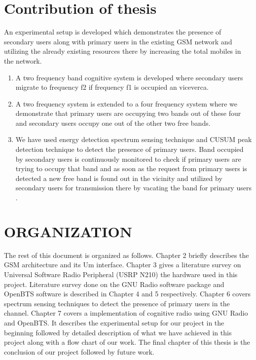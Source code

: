 \section{Contribution of thesis}
An experimental setup is developed which demonstrates the presence of secondary users along with primary users in the existing GSM network and utilizing the already existing resources there by increasing the total mobiles in the network.
\begin{enumerate}
	\item A two frequency band cognitive system is developed where secondary users migrate to frequency f2 if frequency f1 is occupied an viceverca.
	\item A two frequency system is extended to a four frequency system where we demonstrate that primary users are occupying two bands out of these four and secondary users occupy one out of the other two free bands.
	\item  We have used energy detection spectrum sensing technique and CUSUM peak detection technique to detect the presence of primary users. Band occupied by secondary users is continuously monitored to check if primary users are trying to occupy that band and as soon as the request from primary users is detected a new free band is found out in the vicinity and utilized by secondary users for transmission there by vacating the band for primary users . 
\end{enumerate}

\section{ORGANIZATION}
The rest of this document is organized as follows. Chapter 2 briefly describes the GSM architecture and its Um interface. Chapter 3 gives a literature survey on Universal Software Radio Peripheral (USRP N210) the hardware used in this project. Literature survey done on the GNU Radio software package and OpenBTS software is described in Chapter 4 and 5 respectively. Chapter 6 covers spectrum sensing techniques to detect the presence of primary users in the channel.  Chapter 7 covers a implementation of cognitive radio using GNU Radio and OpenBTS. It describes the experimental setup for our project in the beginning followed by detailed description of what we have achieved in this project along with a flow chart of our work. The final chapter of this thesis is the conclusion of our project followed by future work. 
